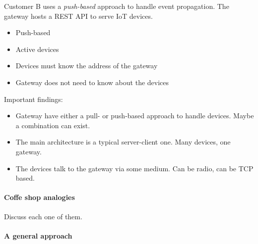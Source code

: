 \documentclass{memoir}
\begin{document}
Customer B uses a \textit{push-based} approach to handle event propagation. The
gateway hosts a REST API to serve IoT devices.

\begin{itemize}
    \item Push-based
    \item Active devices
    \item Devices must know the address of the gateway
    \item Gateway does not need to know about the devices
\end{itemize}

Important findings:

\begin{itemize}
    \item Gateway have either a pull- or push-based approach to handle devices.
        Maybe a combination can exist.
    \item The main architecture is a typical server-client one. Many devices,
        one gateway.
    \item The devices talk to the gateway via some medium. Can be radio, can be
        TCP based.
\end{itemize}

%
%
%

\paragraph{Coffe shop analogies}

Discuss each one of them.

\paragraph{A general approach}
\end{document}
